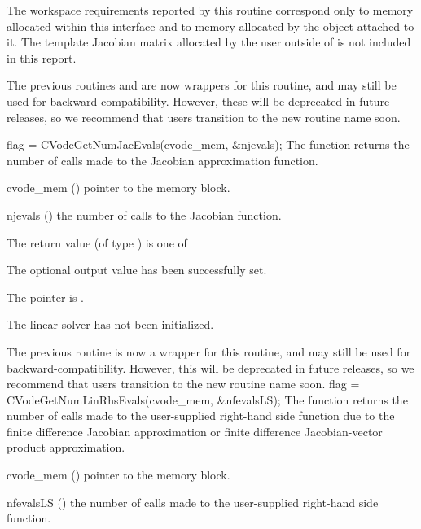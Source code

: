 {
  The workspace requirements reported by this routine correspond only
  to memory allocated within this interface and to memory allocated by
  the {\sunlinsol} object attached to it.  The template Jacobian
  matrix allocated by the user outside of {\cvls} is not included in
  this report.

  The previous routines  and
   are now wrappers for this routine, and may
  still be used for backward-compatibility.  However, these will be
  deprecated in future releases, so we recommend that users transition
  to the new routine name soon.
}
{
  flag = CVodeGetNumJacEvals(cvode\_mem, \&njevals);
}
{
  The function  returns the
  number of calls made to the {\cvls} Jacobian approximation
  function.
}
{
  \begin{args}
  \item[cvode\_mem] ()
    pointer to the {\cvode} memory block.
  \item[njevals] ()
    the number of calls to the Jacobian function.
  \end{args}
}
{
  The return value  (of type ) is one of
  \begin{args}
  \item[\Id{CVLS\_SUCCESS}]
    The optional output value has been successfully set.
  \item[\Id{CVLS\_MEM\_NULL}]
    The  pointer is .
  \item[\Id{CVLS\_LMEM\_NULL}]
    The {\cvls} linear solver has not been initialized.
  \end{args}
}
{
  The previous routine  is now a wrapper for
  this routine, and may still be used for backward-compatibility.
  However, this will be deprecated in future releases, so we recommend
  that users transition to the new routine name soon.
}
{
  flag = CVodeGetNumLinRhsEvals(cvode\_mem, \&nfevalsLS);
}
{
  The function  returns the
  number of calls made to the user-supplied right-hand side function
  due to the finite difference Jacobian approximation or finite
  difference Jacobian-vector product approximation.
}
{
  \begin{args}
  \item[cvode\_mem] ()
    pointer to the {\cvode} memory block.
  \item[nfevalsLS] ()
    the number of calls made to the user-supplied right-hand side function.
  \end{args}
}
